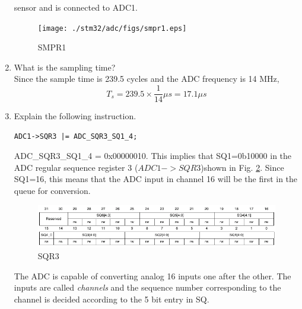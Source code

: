 \begin{enumerate}[label=\arabic*.,ref=\theenumi]
sensor and is connected to ADC1.
%
\begin{figure}
\centering
\texttt{[image: ./stm32/adc/figs/smpr1.eps]}
\caption{SMPR1}
\label{fig:smpr1}
\end{figure}
%
\item What is the sampling time?
\\
\solution Since the sample time is 239.5 cycles and the ADC frequency is 14 MHz, 
\begin{equation}
T_{s} = 239.5 \times \frac{1}{14} \mu s = 17.1 \mu s 
\end{equation}
\item Explain the following instruction.
\begin{lstlisting}
ADC1->SQR3 |= ADC_SQR3_SQ1_4;
\end{lstlisting}

\solution ADC\_SQR3\_SQ1\_4 = 0x00000010.  This implies that SQ1=0b10000 in
the ADC regular sequence register 3 ($ADC1->SQR3$)shown in Fig. \ref{fig:sqr3}. Since SQ1=16,
this means that the ADC input in channel 16 will be the first in the queue
for conversion. 
%
\begin{figure}
\centering
\includegraphics[width=\columnwidth]{./stm32/adc/figs/sqr3}
\caption{SQR3}
\label{fig:sqr3}
\end{figure}
%
The ADC is capable of converting analog 16 inputs one after the other. 
The inputs are called {\em channels} and the sequence number corresponding 
to the channel
is decided
according to the 5 bit entry in SQ. 

\end{enumerate}
